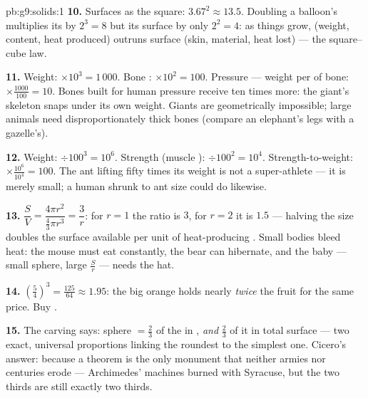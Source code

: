 \begin{solution}{pb:g9:solids:1}
\textbf{10.} Surfaces  as the square: $3.67^2 \approx
13.5$. Doubling a balloon's  multiplies its  by
$2^3 = 8$ but its surface by only $2^2 = 4$: as things grow,
 (weight, content, heat produced) outruns surface (skin,
material, heat lost) --- the square--cube law.

\textbf{11.} Weight: $\times 10^3 = 1\,000$. Bone
: $\times 10^2 = 100$. Pressure --- weight per
 of bone: $\times \frac{1000}{100} = 10$. Bones built for
human pressure receive ten times more: the giant's skeleton
snaps under its own weight. Giants are geometrically
impossible; large animals need disproportionately thick bones
(compare an elephant's legs with a gazelle's).

\textbf{12.} Weight: $\div 100^3 = 10^6$. Strength (muscle
): $\div 100^2 = 10^4$. Strength-to-weight:
$\times \frac{10^6}{10^4} = 100$. The ant lifting fifty times
its weight is not a super-athlete --- it is merely small; a
human shrunk to ant size could do likewise.

\textbf{13.} $\dfrac{S}{V} = \dfrac{4\pi r^2}{\frac43\pi r^3}
= \dfrac{3}{r}$: for $r = 1$ the ratio is $3$, for $r = 2$ it
is $1.5$ --- halving the size doubles the surface available
per unit of heat-producing . Small bodies bleed heat:
the mouse must eat constantly, the bear can hibernate, and the
baby --- small sphere, large $\frac Sr$ --- needs the hat.

\textbf{14.} $\left(\frac54\right)^3 = \frac{125}{64} \approx
1.95$: the big orange holds nearly \emph{twice} the fruit for
the same price. Buy .

\textbf{15.} The carving says: sphere $= \frac23$ of the
 in , \emph{and} $\frac23$ of it in total
surface --- two exact, universal proportions linking the
roundest  to the simplest one. Cicero's answer: because a
theorem is the only monument that neither armies nor centuries
erode --- Archimedes' machines burned with Syracuse, but the
two thirds are still exactly two thirds.
\end{solution}
